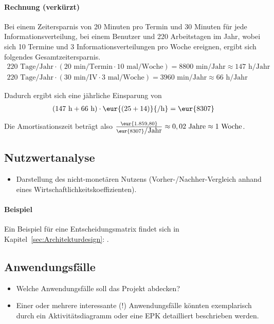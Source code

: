 \paragraph{Rechnung (verkürzt)}
Bei einem Zeitersparnis von 20 Minuten pro Termin und 30 Minuten für jede Informationsverteilung, bei einem Benutzer und 220 Arbeitstagen im Jahr, wobei sich 10 Termine und 3 Informationsverteilungen pro Woche ereignen, ergibt sich folgendes Gesamtzeitersparnis.
\begin{eqnarray}
220 \mbox{ Tage/Jahr} \cdot (20 \mbox{ min/Termin} \cdot 10 \mbox{ mal/Woche}) = 8800 \mbox{ min/Jahr} \approx 147 \mbox{ h/Jahr}\\
220 \mbox{ Tage/Jahr} \cdot (30 \mbox{ min/IV} \cdot 3 \mbox{ mal/Woche}) = 3960 \mbox{ min/Jahr} \approx 66 \mbox{ h/Jahr}
\end{eqnarray}

Dadurch ergibt sich eine jährliche Einsparung von 
\begin{eqnarray}
(147 \mbox{ h} + 66 \mbox{ h}) \cdot \eur{(25 + 14)}{\mbox{/h}} = \eur{8307}
\end{eqnarray}

Die Amortisationszeit beträgt also $\frac{\eur{1.859,80}}{\eur{8307}\mbox{/Jahr}} \approx 0,02 \mbox{ Jahre} \approx 1 \mbox{ Woche}$.


\subsection{Nutzwertanalyse}
\label{sec:Nutzwertanalyse}
\begin{itemize}
	\item Darstellung des nicht-monetären Nutzens (\zB Vorher-/Nachher-Vergleich anhand eines Wirtschaftlichkeitskoeffizienten). 
\end{itemize}

\paragraph{Beispiel}
Ein Beispiel für eine Entscheidungsmatrix findet sich in Kapitel~\ref{sec:Architekturdesign}: .


\subsection{Anwendungsfälle}
\label{sec:Anwendungsfaelle}
\begin{itemize}
	\item Welche Anwendungsfälle soll das Projekt abdecken?
	\item Einer oder mehrere interessante (!) Anwendungsfälle könnten exemplarisch durch ein Aktivitätsdiagramm oder eine \ac{EPK} detailliert beschrieben werden. 
\end{itemize}

